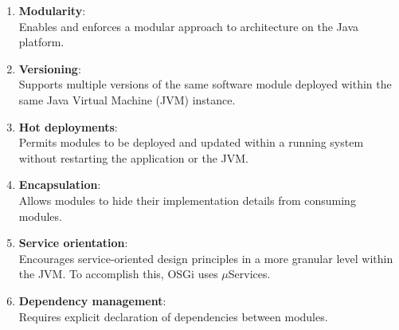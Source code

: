 \begin{enumerate}
	\item \textbf{Modularity}: \\
	Enables and enforces a modular approach to architecture on the Java platform.
	\item \textbf{Versioning}: \\
	Supports multiple versions of the same software module deployed within the same Java Virtual Machine (JVM) instance.
	\item \textbf{Hot deployments}: \\
	Permits modules to be deployed and updated within a running system without restarting the application or the JVM.
	\item \textbf{Encapsulation}: \\
	Allows modules to hide their implementation details from consuming modules.
	\item \textbf{Service orientation}: \\
	Encourages service-oriented design principles in a more granular level within the JVM. To accomplish this, OSGi uses $\mu$Services.
	\item \textbf{Dependency management}: \\
	Requires explicit declaration of dependencies between modules.
\end{enumerate}